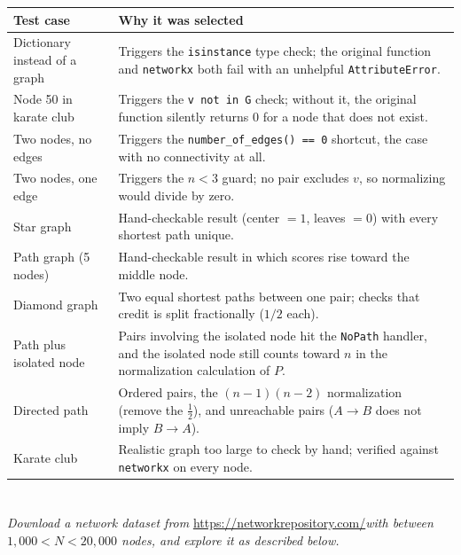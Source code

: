 \documentclass{article}
\begin{document}
\begin{enumerate}[label=(\alph*)]
    \begin{table}[h]
\centering
\small
\begin{tabular}{@{}p{}p{}@{}}
\toprule
\textbf{Test case} & \textbf{Why it was selected} \\
\midrule
Dictionary instead of a graph & Triggers the \texttt{isinstance} type check; the original function and \texttt{networkx} both fail with an unhelpful \texttt{AttributeError}. \\\hline
Node 50 in karate club & Triggers the \texttt{v not in G} check; without it, the original function silently returns $0$ for a node that does not exist. \\\hline
Two nodes, no edges & Triggers the \texttt{number\_of\_edges() == 0} shortcut, the case with no connectivity at all. \\\hline
Two nodes, one edge & Triggers the $n<3$ guard; no pair excludes $v$, so normalizing would divide by zero. \\\hline
Star graph & Hand-checkable result (center $=1$, leaves $=0$) with every shortest path unique. \\\hline
Path graph (5 nodes) & Hand-checkable result in which scores rise toward the middle node. \\\hline
Diamond graph & Two equal shortest paths between one pair; checks that credit is split fractionally ($1/2$ each). \\\hline
Path plus isolated node & Pairs involving the isolated node hit the \texttt{NoPath} handler, and the isolated node still counts toward $n$ in the normalization calculation of $P$. \\\hline
Directed path & Ordered pairs, the $(n-1)(n-2)$ normalization (remove the $\frac{1}{2}$), and unreachable pairs ($A\to B$ does not imply $B\to A$). \\\hline
Karate club & Realistic graph too large to check by hand; verified against \texttt{networkx} on every node. \\
\bottomrule
\end{tabular}
\end{table}

\end{enumerate}
\clearpage

\section{}

\textit{Download a network dataset from }\url{https://networkrepository.com/}\textit{with between $1{,}000 < N < 20{,}000$ nodes, and explore it as described below.}
\end{document}
